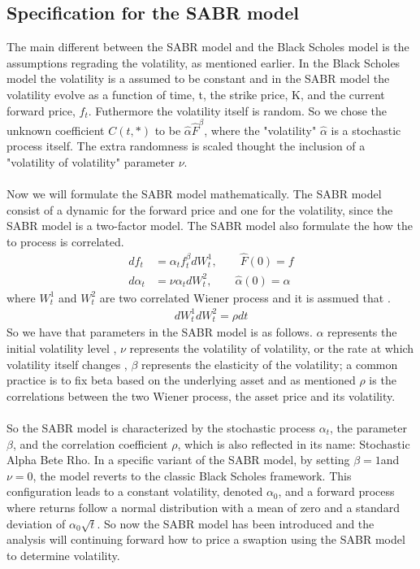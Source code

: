 \subsection{Specification for the SABR model}
The main different between the SABR model and the 
Black Scholes model is the assumptions regrading the 
volatility, as mentioned earlier. In the Black Scholes 
model the volatility is a assumed to be constant and 
in the SABR model the volatility evolve as a function
of time, t, the strike price, K, and the current
forward price, $f_t$. Futhermore the volatility itself
is random. So we chose the unknown coefficient $C(t,*)$
to be $\hat{\alpha} \hat{F}^{\beta}$, where the 
"volatility" $\hat{\alpha}$ is a stochastic process itself. 
The extra randomness is scaled thought the inclusion 
of a "volatility of volatility" parameter $\nu$.
\\\\
Now we will formulate the SABR model mathematically. 
The SABR model consist of a dynamic for the forward price
and one for the volatility, since the SABR model is a 
two-factor model. The SABR model also formulate the 
how the to process is correlated. 
\begin{align}
    df_t &= \alpha_t f_t^\beta dW_t^1, \quad \quad \hat{F}(0)=f  \\
    d\alpha_t &= \nu \alpha_t dW_t^2, \quad \quad \hat{\alpha}(0)=\alpha
\end{align}
where $W_t^{1}$ and $W_t^{2}$ are two correlated Wiener 
process and it is assmued that \cite{Smile}.
\begin{align}
    dW_t^{1}dW_t^{2}=\rho dt
\end{align}
So we have that 
parameters in the SABR model is as follows. $\alpha$ represents the initial volatility level
, $\nu$ represents the volatility of volatility, or the rate at which volatility itself changes
, $\beta$ represents the elasticity of the volatility; a common practice is to fix beta based on the underlying asset 
and as mentioned $\rho$ is the correlations between the 
two Wiener process, the asset price and its volatility. 
\\\\
So the SABR model is characterized by the stochastic process $\alpha_t$,
the parameter $\beta$, and the correlation coefficient $\rho$,
which is also reflected in its name: Stochastic Alpha Bete Rho.
In a specific variant of the SABR model, 
by setting $\beta = 1 $and $\nu = 0$, the model reverts 
to the classic Black Scholes framework. 
This configuration leads to a constant volatility, 
denoted $\alpha_0 $, 
and a forward process where returns follow a 
normal distribution with a mean of zero and a standard 
deviation of $\alpha_0 \sqrt{t}$. So now the SABR model
has been introduced and the analysis will continuing forward 
how to price a swaption using the SABR model to determine
volatility.
